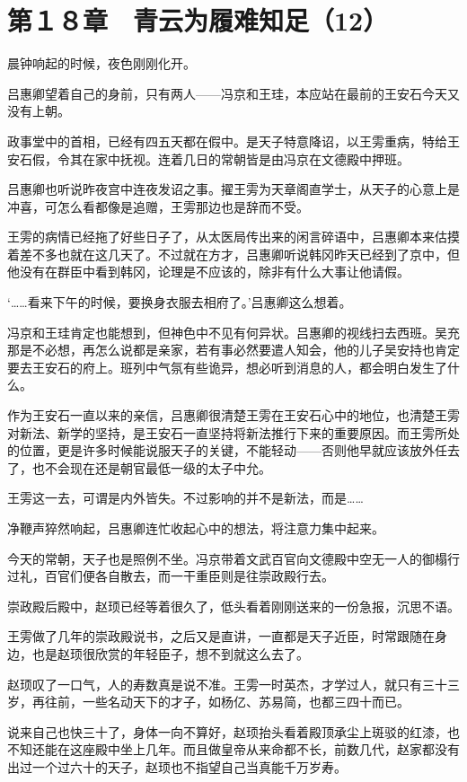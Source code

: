 \section{第１８章　青云为履难知足（12）}

晨钟响起的时候，夜色刚刚化开。

吕惠卿望着自己的身前，只有两人——冯京和王珪，本应站在最前的王安石今天又没有上朝。

政事堂中的首相，已经有四五天都在假中。是天子特意降诏，以王雱重病，特给王安石假，令其在家中抚视。连着几日的常朝皆是由冯京在文德殿中押班。

吕惠卿也听说昨夜宫中连夜发诏之事。擢王雱为天章阁直学士，从天子的心意上是冲喜，可怎么看都像是追赠，王雱那边也是辞而不受。

王雱的病情已经拖了好些日子了，从太医局传出来的闲言碎语中，吕惠卿本来估摸着差不多也就在这几天了。不过就在方才，吕惠卿听说韩冈昨天已经到了京中，但他没有在群臣中看到韩冈，论理是不应该的，除非有什么大事让他请假。

‘……看来下午的时候，要换身衣服去相府了。’吕惠卿这么想着。

冯京和王珪肯定也能想到，但神色中不见有何异状。吕惠卿的视线扫去西班。吴充那是不必想，再怎么说都是亲家，若有事必然要遣人知会，他的儿子吴安持也肯定要去王安石的府上。班列中气氛有些诡异，想必听到消息的人，都会明白发生了什么。

作为王安石一直以来的亲信，吕惠卿很清楚王雱在王安石心中的地位，也清楚王雱对新法、新学的坚持，是王安石一直坚持将新法推行下来的重要原因。而王雱所处的位置，更是许多时候能说服天子的关键，不能轻动——否则他早就应该放外任去了，也不会现在还是朝官最低一级的太子中允。

王雱这一去，可谓是内外皆失。不过影响的并不是新法，而是……

净鞭声猝然响起，吕惠卿连忙收起心中的想法，将注意力集中起来。

今天的常朝，天子也是照例不坐。冯京带着文武百官向文德殿中空无一人的御榻行过礼，百官们便各自散去，而一干重臣则是往崇政殿行去。

崇政殿后殿中，赵顼已经等着很久了，低头看着刚刚送来的一份急报，沉思不语。

王雱做了几年的崇政殿说书，之后又是直讲，一直都是天子近臣，时常跟随在身边，也是赵顼很欣赏的年轻臣子，想不到就这么去了。

赵顼叹了一口气，人的寿数真是说不准。王雱一时英杰，才学过人，就只有三十三岁，再往前，一些名动天下的才子，如杨亿、苏易简，也都三四十而已。

说来自己也快三十了，身体一向不算好，赵顼抬头看着殿顶承尘上斑驳的红漆，也不知还能在这座殿中坐上几年。而且做皇帝从来命都不长，前数几代，赵家都没有出过一个过六十的天子，赵顼也不指望自己当真能千万岁寿。

